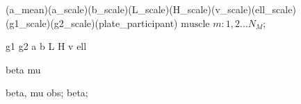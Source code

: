 \documentclass[a4paper,12pt]{article}
\begin{document}
\begin{figure}[H]
{        %
         {(a_mean)(a_scale)(b_scale)(L_scale)(H_scale)(v_scale)(ell_scale)(g1_scale)(g2_scale)(plate_participant)} {$\text{muscle }m : 1, 2 \ldots N_M$};

         {g1}
         {g2}
         {a}
         {b}
         {L}
         {H}
         {v}
         {ell}

         {beta}
         {mu}

         {beta, mu}
         {obs};
         {beta};
    }
\end{figure}
\end{document}
